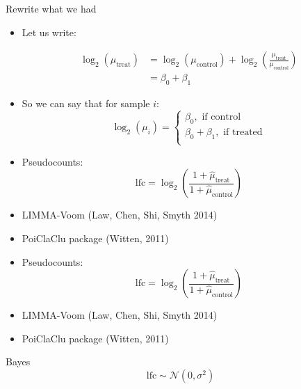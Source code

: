 \documentclass[red,xcolor={table,usenames,dvipsnames}]{beamer}
\begin{document}
\begin{frame}{Rewrite what we had}

\begin{itemize}
  \item Let us write:

   $$
   \begin{aligned}
   \log_2(\mu_{\text{treat}}) &= \log_2(\mu_{\text{control}}) + \log_2\left(\frac{\mu_{\text{treat}}}{\mu_{\text{control}}} \right) \\
    &= \beta_0 + \beta_1
   \end{aligned}
   $$

   \item So we can say that for sample $i$:
$$
\log_2(\mu_i)=
\begin{cases}
\beta_0, \text{ if control}\\
\beta_0 + \beta_1,\text{ if treated}\\
\end{cases}
$$
\end{itemize}
\end{frame}




\begin{frame}
  \begin{itemize}
\item Pseudocounts:
 $$\widehat{\text{lfc}} = \log_2\left(\frac{1+\hat{\mu}_{\text{treat}}}{1+\hat{\mu}_{\text{control}}} \right)$$
 \item LIMMA-Voom (Law, Chen, Shi, Smyth 2014)
 \item PoiClaClu package (Witten, 2011)
\end{itemize}
\end{frame}

\begin{frame}
  \begin{itemize}
\item Pseudocounts:
 $$\widehat{\text{lfc}} = \log_2\left(\frac{1+\hat{\mu}_{\text{treat}}}{1+\hat{\mu}_{\text{control}}} \right)$$
 \item LIMMA-Voom (Law, Chen, Shi, Smyth 2014)
 \item PoiClaClu package (Witten, 2011)
\end{itemize}
\end{frame}


\begin{frame}{Bayes}
  $$\text{lfc} \sim \mathcal{N}\left(0,\sigma^2\right)$$
\end{frame}
\end{document}
